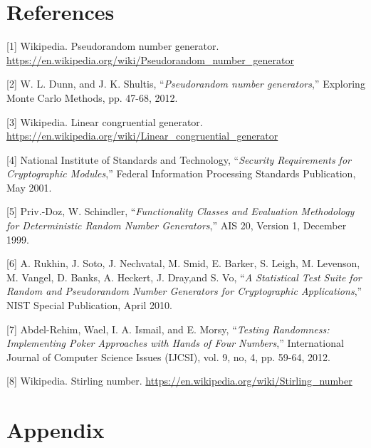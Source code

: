 \documentclass[a4paper]{article}
\begin{document}
\section{References}
	[1] Wikipedia. Pseudorandom number generator. \url{https://en.wikipedia.org/wiki/Pseudorandom_number_generator}

	[2] W. L. Dunn, and J. K. Shultis, “\textit{Pseudorandom number generators},” Exploring Monte Carlo Methods, pp. 47-68, 2012.

	[3] Wikipedia. Linear congruential generator. \url{https://en.wikipedia.org/wiki/Linear_congruential_generator}

	[4] National Institute of Standards and Technology, “\textit{Security Requirements for Cryptographic Modules},” Federal Information Processing Standards Publication, May 2001.
	
	[5] Priv.-Doz, W. Schindler, “\textit{Functionality Classes and Evaluation Methodology for Deterministic Random Number Generators},” AIS 20, Version 1, December 1999.
	
	[6] A. Rukhin, J. Soto, J. Nechvatal, M. Smid, E. Barker, S. Leigh, M. Levenson, M. Vangel, D. Banks, A. Heckert, J. Dray,and S. Vo, “\textit{A Statistical Test Suite for Random and Pseudorandom Number Generators for Cryptographic Applications},” NIST Special Publication, April 2010.
	
	[7] Abdel-Rehim, Wael, I. A. Ismail, and E. Morsy, “\textit{Testing Randomness: Implementing Poker Approaches with Hands of Four Numbers},” International Journal of Computer Science Issues (IJCSI), vol. 9, no, 4, pp. 59-64, 2012.
	
	[8] Wikipedia. Stirling number. \url{https://en.wikipedia.org/wiki/Stirling_number}
	
\newpage

\section{Appendix}
\end{document}
